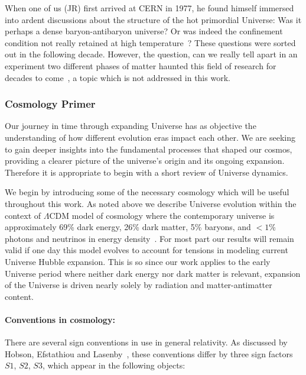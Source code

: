  When one of us (JR) first arrived at CERN in 1977, he found himself immersed into ardent discussions about the structure of the hot primordial Universe: Was it perhaps a dense baryon-antibaryon universe? Or was indeed the confinement condition not really retained at high temperature~\cite{Weinberg:1974hy,Harrington:1974fc,Cabibbo:1975ig}? These questions were sorted out in the following decade. However, the question, can we really tell apart in an experiment two different phases of matter haunted this field of research for decades to come~\cite{Rafelski:2015cxa,Harris:2024aov}, a topic which is not addressed in this work.


\subsubsection{Cosmology Primer}
\label{sec:flrw}
Our journey in time through expanding Universe has as objective the understanding of how different evolution eras impact each other. We are seeking to gain deeper insights into the fundamental processes that shaped our cosmos, providing a clearer picture of the universe's origin and its ongoing expansion. Therefore it is appropriate to begin with a short review of Universe dynamics.

We begin by introducing some of the necessary cosmology which will be useful throughout this work. As noted above we describe Universe evolution within the context of $\Lambda\mathrm{CDM}$ model of cosmology where the contemporary universe is approximately 69\% dark energy, 26\% dark matter, 5\% baryons, and $<1$\% photons and neutrinos in energy density~\cite{Davis:2003ad,Planck:2018vyg}. For most part our results will remain valid if one day this model evolves to account for tensions in modeling current Universe Hubble expansion. This is so since our work applies to the early Universe period where neither dark energy nor dark matter is relevant, expansion of the Universe is driven nearly solely by radiation and matter-antimatter content. 

\paragraph{Conventions in cosmology:}
There are several sign conventions in use in general relativity. As discussed by Hobson, Efstathiou and Lasenby~\cite{Hobson:2006se}, these conventions differ by three sign factors $S1$, $S2$, $S3$, which appear in the following objects:
\vspace{3mm}

